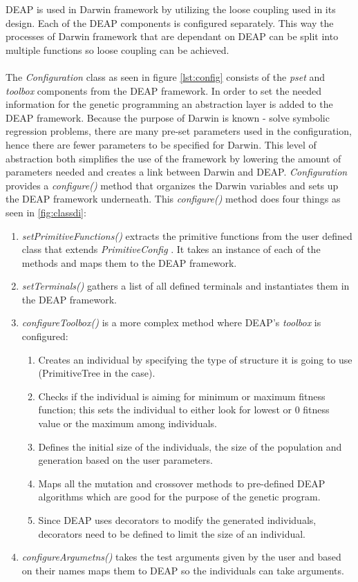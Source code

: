 DEAP is used in Darwin framework by utilizing the loose coupling used in its design. Each of the DEAP components is configured
separately. This way the processes of Darwin framework that are dependant on DEAP can be split into multiple functions so loose coupling can
be achieved.
\paragraph{}
The \textit{Configuration} class as seen in figure \ref{lst:config} consists of the \textit{pset} and \textit{toolbox} components
from the DEAP framework. In order to set the needed information for the genetic programming an abstraction layer is added to the DEAP framework.
Because the purpose of Darwin is known - solve symbolic regression problems, there are many pre-set parameters used in the configuration, hence there are 
fewer parameters to be specified for Darwin. This level of abstraction both simplifies the use of the
framework by lowering the amount of parameters needed and creates a link between Darwin and DEAP. \textit{Configuration} provides a \textit{configure()} method
that organizes the Darwin variables and sets up the DEAP framework underneath. This \textit{configure()} method does four things as seen in \ref{fig:classdi}:

\begin{enumerate}
  \item \textit{setPrimitiveFunctions()} extracts the primitive functions from the user defined class that extends \textit{PrimitiveConfig} . It takes an instance
of each of the methods and maps them to the DEAP framework.
  \item \textit{setTerminals()} gathers a list of all defined terminals and instantiates them in the DEAP framework.
  \item \textit{configureToolbox()} is a more complex method where DEAP's \textit{toolbox} is configured:
  \begin{enumerate}
	\item Creates an individual by specifying the type of structure it is going to use (PrimitiveTree in the case). 
	\item Checks if the individual is aiming for minimum or maximum fitness function; this sets the individual to either look for lowest or 0 fitness value or the maximum among individuals.
	\item Defines the initial size of the individuals, the size of the population and generation based on the user parameters.
	\item Maps all the mutation and crossover methods to pre-defined DEAP algorithms which are good for the purpose of the genetic program.
	\item Since DEAP uses decorators to modify the generated individuals, decorators need to be defined to limit the size of an individual.
  \end{enumerate}
  \item \textit{configureArgumetns()} takes the test arguments given by the user and based on their names maps them to DEAP so the individuals can take arguments.
\end{enumerate}

